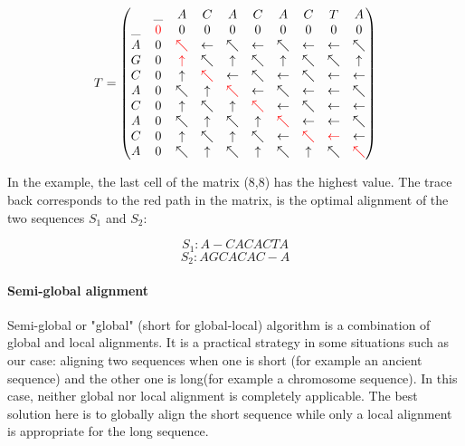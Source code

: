 \documentclass[11pt,a4paper]{report}
\begin{document}
\[
T = 
 \begin{pmatrix}
       & $\_$ & A & C & A & C & A & C & T & A \\
  $\_$ & \textcolor{red}{0} & 0 & 0 & 0 & 0 & 0 & 0 & 0 & 0 \\
 A & 0 & \textcolor{red}{\nwarrow} & \leftarrow & \nwarrow & \leftarrow & \nwarrow & \leftarrow & \leftarrow & \nwarrow \\
 G & 0 & \textcolor{red}{\uparrow} & \nwarrow & \uparrow & \nwarrow & \uparrow & \nwarrow & \nwarrow & \uparrow \\
 C & 0 & \uparrow & \textcolor{red}{\nwarrow} & \leftarrow & \nwarrow & \leftarrow & \nwarrow & \leftarrow & \leftarrow \\
 A & 0 & \nwarrow & \uparrow & \textcolor{red}{\nwarrow} & \leftarrow & \nwarrow & \leftarrow & \leftarrow & \nwarrow \\
 C & 0 & \uparrow & \nwarrow & \uparrow & \textcolor{red}{\nwarrow} & \leftarrow & \nwarrow & \leftarrow & \leftarrow \\
 A & 0 & \nwarrow & \uparrow & \nwarrow & \uparrow & \textcolor{red}{\nwarrow} & \leftarrow & \leftarrow & \nwarrow \\
 C & 0 & \uparrow & \nwarrow & \uparrow & \nwarrow & \leftarrow & \textcolor{red}{\nwarrow} & \textcolor{red}{\leftarrow} & \leftarrow \\
 A & 0 & \nwarrow & \uparrow & \nwarrow & \uparrow & \nwarrow & \uparrow & \nwarrow & \textcolor{red}{\nwarrow} \\
 \end{pmatrix}
\]

In the example, the last cell of the matrix (8,8) has the highest value. The trace back corresponds to the red path in the matrix, is the optimal alignment of the two sequences $S_{1}$ and $S_{2}$: 

$$S_{1}:A-CACACTA$$
$$S_{2}:AGCACAC-A$$



\paragraph{Semi-global alignment}

Semi-global or "global" (short for global-local) algorithm is a combination of global and local alignments. It is a practical strategy in some situations such as our case: aligning two sequences when one is short (for example an ancient sequence) and the other one is long(for example a chromosome sequence). In this case, neither global nor local alignment is completely applicable. The best solution here is to globally align the short sequence while only a local alignment is appropriate for the long sequence.
\end{document}

